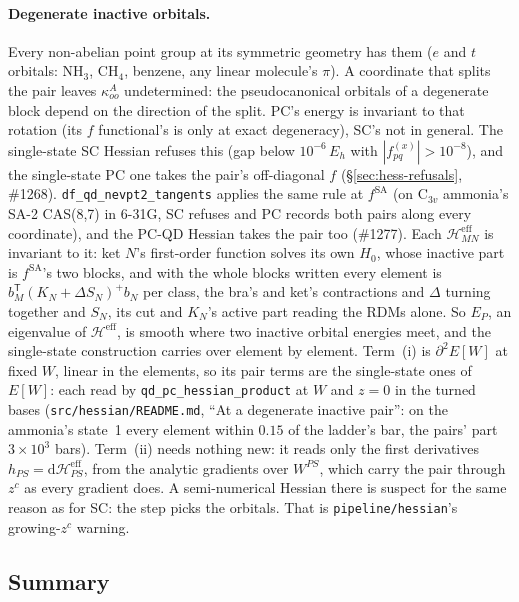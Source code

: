 \documentclass[11pt]{article}
\newcommand{\code}[1]{\texttt{#1}}
\begin{document}
\paragraph{Degenerate inactive orbitals.} Every non-abelian point group
at its symmetric geometry has them ($e$ and $t$ orbitals: NH$_3$,
CH$_4$, benzene, any linear molecule's $\pi$). A coordinate that splits
the pair leaves $\kappa^A_{oo}$ undetermined: the pseudocanonical
orbitals of a degenerate block depend on the direction of the split. PC's
energy is invariant to that rotation (its $f$ functional's is only at
exact degeneracy), SC's not in general. The single-state SC Hessian
refuses this (gap below $10^{-6}\,E_h$ with $|f^{(x)}_{pq}| > 10^{-8}$),
and the single-state PC one takes the pair's off-diagonal $f$
(\S\ref{sec:hess-refusals}, \#1268). \code{df\_qd\_nevpt2\_tangents}
applies the same rule at $f^{\mathrm{SA}}$ (on C$_{3v}$ ammonia's SA-2
CAS(8,7) in 6-31G, SC refuses and PC records both pairs along every
coordinate), and the PC-QD Hessian takes the pair too (\#1277). Each
$\mathcal{H}^{\mathrm{eff}}_{MN}$ is invariant to it: ket $N$'s
first-order function solves its own $H_0$, whose inactive part is
$f^{\mathrm{SA}}$'s two blocks, and with the whole blocks written every
element is $b_M^{\mathsf T}(K_N + \Delta S_N)^{+} b_N$ per class, the
bra's and ket's contractions and $\Delta$ turning together and $S_N$, its
cut and $K_N$'s active part reading the RDMs alone. So $E_P$, an
eigenvalue of $\mathcal{H}^{\mathrm{eff}}$, is smooth where two inactive
orbital energies meet, and the single-state construction carries over
element by element. Term~(i) is $\partial^2 E[W]$ at fixed $W$, linear in
the elements, so its pair terms are the single-state ones of $E[W]$: each
read by \code{qd\_pc\_hessian\_product} at $W$ and $z = 0$ in the turned
bases (\code{src/hessian/README.md}, ``At a degenerate inactive pair'':
on the ammonia's state~1 every element within $0.15$ of the ladder's bar,
the pairs' part $3\times10^3$ bars). Term~(ii) needs nothing new: it reads only the first derivatives
$h_{PS} = \mathrm{d}\mathcal{H}^{\mathrm{eff}}_{PS}$, from the analytic
gradients over $W^{PS}$, which carry the pair through $z^c$ as every
gradient does. A semi-numerical Hessian there is suspect for the same
reason as for SC: the step picks the orbitals. That is
\code{pipeline/hessian}'s growing-$z^c$ warning.

\subsection{Summary}
\end{document}
